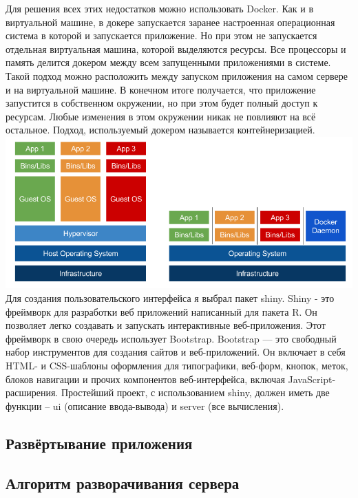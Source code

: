 \documentclass[14pt,a4paper]{scrartcl}
\begin{document}
    Для решения всех этих недостатков можно использовать Docker. Как и в виртуальной машине, в докере запускается заранее настроенная операционная система в которой и запускается приложение. Но при этом не запускается отдельная виртуальная машина, которой выделяются ресурсы. Все процессоры и память делится докером между всем запущенными приложениями в системе. Такой подход можно расположить между запуском приложения на самом сервере и на виртуальной машине. В конечном итоге получается, что приложение запустится в собственном окружении, но при этом будет полный доступ к ресурсам. Любые изменения в этом окружении никак не повлияют на всё остальное. Подход, используемый докером называется контейнеризацией.
    \newline
    \newline
    \includegraphics[width=\textwidth]{Docker-struct.png}
    \newpage
    Для создания пользовательского интерфейса я выбрал пакет shiny. Shiny - это фреймворк для разработки веб приложений написанный для пакета R. Он позволяет легко создавать и запускать интерактивные веб-приложения. Этот фреймворк в свою очередь использует Bootstrap. Bootstrap — это свободный набор инструментов для создания сайтов и веб-приложений. Он включает в себя HTML- и CSS-шаблоны оформления для типографики, веб-форм, кнопок, меток, блоков навигации и прочих компонентов веб-интерфейса, включая JavaScript-расширения. Простейший проект, с использованием shiny, должен иметь две функции – ui (описание ввода-вывода) и server (все вычисления).

    \subsection[Развёртывание приложения]{Развёртывание приложения}
    \subsection[Алгоритм разворачивания сервера]{Алгоритм разворачивания сервера}
\end{document}
